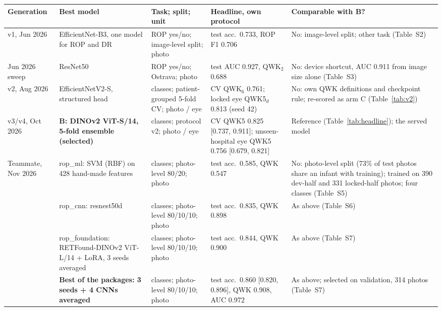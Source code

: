 \begin{tabular}{@{}>{\raggedright\arraybackslash}p{1.55cm}>{\raggedright\arraybackslash}p{4.1cm}>{\raggedright\arraybackslash}p{3.0cm}>{\raggedright\arraybackslash}p{3.55cm}>{\raggedright\arraybackslash}p{4.9cm}@{}}
\toprule
Generation & Best model & Task; split; unit & Headline, own protocol & Comparable with B?\\
\midrule
v1, Jun 2026 & EfficientNet-B3, one model for ROP and DR & ROP yes/no; image-level split; photo & test acc.\ 0.733, ROP F1 0.706 & No: image-level split; other task (Table~S2) \\
Jun 2026 sweep & ResNet50 & ROP yes/no; Ostrava; photo & test AUC 0.927, QWK$_2$ 0.688 & No: device shortcut, AUC 0.911 from image size alone (Table~S3) \\
v2, Aug 2026 & EfficientNetV2-S, structured head & 6 classes; patient-grouped 5-fold CV; photo / eye & CV QWK$_6$ 0.761; locked eye QWK5$_d$ 0.813 (seed 42) & No: own QWK definitions and checkpoint rule; re-scored as arm C (Table~\ref{tab:v2}) \\
v3/v4, Oct 2026 & \textbf{B: DINOv2 ViT-S/14, 5-fold ensemble (selected)} & 6 classes; protocol v2; photo / eye & CV QWK5 0.825 [0.737, 0.911]; unseen-hospital eye QWK5 0.756 [0.679, 0.821] & Reference (Table~\ref{tab:headline}); the served model \\
Teammate, Nov 2026 & rop\_ml: SVM (RBF) on 428 hand-made features & 4 classes; photo-level 80/20; photo & test acc.\ 0.585, QWK 0.547 & No: photo-level split (73\% of test photos share an infant with training); trained on 390 dev-half and 331 locked-half photos; four classes (Table~S5) \\
 & rop\_cnn: resnest50d & 4 classes; photo-level 80/10/10; photo & test acc.\ 0.835, QWK 0.898 & As above (Table~S6) \\
 & rop\_foundation: RETFound-DINOv2 ViT-L/14 + LoRA, 3 seeds averaged & 4 classes; photo-level 80/10/10; photo & test acc.\ 0.844, QWK 0.900 & As above (Table~S7) \\
 & \textbf{Best of the packages: 3 seeds + 4 CNNs averaged} & 4 classes; photo-level 80/10/10; photo & test acc.\ 0.860 [0.820, 0.896], QWK 0.908, AUC 0.972 & As above; selected on validation, 314 photos (Table~S7) \\
\bottomrule
\end{tabular}
